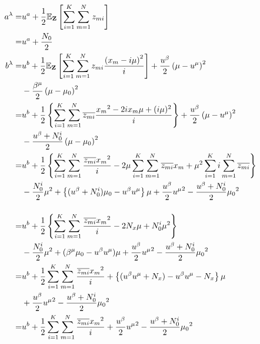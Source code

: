 \begin{align}
  a^\lambda  =&  u^a + \frac{1}{2} \mathbb{E}_{\bf Z}\left[ \sum_{i=1}^K \sum_{m=1}^N z_{mi} \right]  \\
  =&  u^a + \frac{N_0}{2}  \\
  b^\lambda  =&  u^b + \frac{1}{2} \mathbb{E}_{\bf Z}\left[ \sum_{i=1}^K \sum_{m=1}^N z_{mi} \frac{\left( x_m - i \mu \right)^2}{i} \right]  + \frac{u^\beta}{2} \left( \mu - u^\mu \right)^2  \notag  \\  
    &  - \frac{\beta^\mu}{2} \left( \mu - \mu_{0} \right)^2  \\
%
  =&  u^b + \frac{1}{2} \left\{ \sum_{i=1}^K \sum_{m=1}^N \overline{z_{mi}} \frac{ {x_m}^2 - 2 i x_m \mu + (i \mu)^2}{i}  \right\}  + \frac{u^\beta}{2} \left( \mu - u^\mu \right)^2  \notag  \\  
    &  - \frac{u^\beta + N_0^i}{2} \left( \mu - \mu_{0} \right)^2  \\
%
  =&  u^b + \frac{1}{2} \left\{  
      \sum_{i=1}^K \sum_{m=1}^N \frac{ \overline{z_{mi}} {x_m}^2}{i}  
      - 2 \mu \sum_{i=1}^K \sum_{m=1}^N \overline{z_{mi}} x_m  
      + \mu^2 \sum_{i=1}^K i \sum_{m=1}^N \overline{z_{mi}}  
    \right\}  \notag  \\  
    &  - \frac{N_0^i}{2} \mu^2  + \left\{ (u^\beta + N_0^i) \mu_0 - u^\beta u^\mu \right\} \mu
    + \frac{u^\beta}{2} {u^\mu}^2 - \frac{u^\beta + N_0^i}{2} {\mu_{0}}^2  \\
%
\intertext{}
%
  =&  u^b + \frac{1}{2} \left\{  
      \sum_{i=1}^K \sum_{m=1}^N \frac{ \overline{z_{mi}} {x_m}^2}{i}  -  2 N_x \mu  +  N_0^i \mu^2  \right\}  \notag  \\  
    &  - \frac{N_0^i}{2} \mu^2  + ( \beta^\mu \mu_0 - u^\beta u^\mu ) \mu
    + \frac{u^\beta}{2} {u^\mu}^2 - \frac{u^\beta + N_0^i}{2} {\mu_{0}}^2  \\
%
  =&  u^b + \frac{1}{2} \sum_{i=1}^K \sum_{m=1}^N \frac{ \overline{z_{mi}} {x_m}^2}{i}  
      +  \left\{ (u^\beta u^\mu + N_x) - u^\beta u^\mu - N_x \right\} \mu  \notag  \\  
    &  + \frac{u^\beta}{2} {u^\mu}^2 - \frac{u^\beta + N_0^i}{2} {\mu_{0}}^2  \\
%
  =&  u^b + \frac{1}{2} \sum_{i=1}^K \sum_{m=1}^N \frac{ \overline{z_{mi}} {x_m}^2}{i}  
    + \frac{u^\beta}{2} {u^\mu}^2 - \frac{u^\beta + N_0^i}{2} {\mu_{0}}^2  
\end{align}

